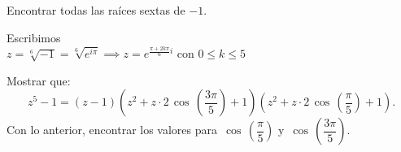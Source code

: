 \documentclass[twoside]{book}
\renewcommand{\cos}{\,\operatorname{cos}\,}
\begin{document}
\begin{example}{}
    Encontrar todas las ra\'ices sextas de $-1$.
\end{example}
\begin{sol}
    \begin{solucion}{}
        Escribimos\\
        $z=\sqrt[6]{-1}=\sqrt[6]{e^{i\pi}}\implies z=e^{\frac{\pi+2k\pi}{6}i}$ con $0\leq k\leq 5$
    \end{solucion}
\end{sol}
\begin{example}{}
    Mostrar que:
    $$ z^5-1=(z-1)\left(z^2+z\cdot2\cos\left(\dfrac{3\pi}{5}\right)+1\right)\left(z^2+z\cdot2\cos\left(\dfrac{\pi}{5}\right)+1\right).$$
    Con lo anterior, encontrar los valores para $\cos\left(\dfrac{\pi}{5}\right)  \text{ y } \cos\left(\dfrac{3\pi}{5}\right)$.
\end{example}
\end{document}

